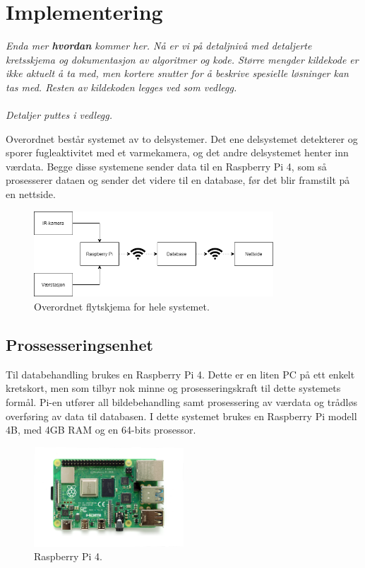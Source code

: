 \section{Implementering}
\label{sec:implementering}
\textit{Enda mer \textbf{hvordan} kommer her. Nå er vi på detaljnivå med detaljerte kretsskjema og dokumentasjon av algoritmer og kode. Større mengder kildekode er ikke aktuelt å ta med, men kortere snutter for å beskrive spesielle løsninger kan tas med. Resten av kildekoden legges ved som vedlegg. \\
\\
Detaljer puttes i vedlegg.}

Overordnet består systemet av to delsystemer. Det ene delsystemet detekterer og sporer fugleaktivitet med et varmekamera, og det andre delsystemet henter inn værdata. Begge disse systemene sender data til en Raspberry Pi 4, som så prosesserer dataen og sender det videre til en database, før det blir framstilt på en nettside. 

\begin{figure}[H]
    \centering
    \includegraphics[width=0.8\textwidth]{implementering/implementering.png}
    \caption{Overordnet flytskjema for hele systemet.}
    \label{fig:implementasjon}
\end{figure}


\subsection{Prossesseringsenhet}

Til databehandling brukes en Raspberry Pi 4. Dette er en liten PC på ett enkelt kretskort, men som tilbyr nok minne og prosesseringskraft til dette systemets formål. Pi-en utfører all bildebehandling samt prosessering av værdata og trådløs overføring av data til databasen. I dette systemet brukes en Raspberry Pi modell 4B, med 4GB RAM og en 64-bits prosessor.

\begin{figure}[H]
    \centering
    \includegraphics[width=0.5\textwidth]{implementering/pi4.png}
    \caption{Raspberry Pi 4.}
    \label{fig:pi}
\end{figure}

